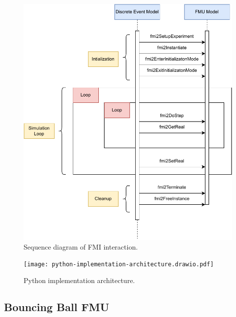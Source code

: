 \documentclass[conference]{IEEEtran}
\begin{document}
\begin{figure}[htbp]
  \centering
  \includegraphics[width=\linewidth]{images/fmi-sequence.drawio.pdf}
  \caption{Sequence diagram of FMI interaction.}
  \label{fmi-sequence}
\end{figure}

\begin{figure}[htbp]
  \centering
  \texttt{[image: python-implementation-architecture.drawio.pdf]}
  \caption{Python implementation architecture.}
  \label{python-implementation-architecture}
\end{figure}

\subsection{Bouncing Ball FMU}
\end{document}

